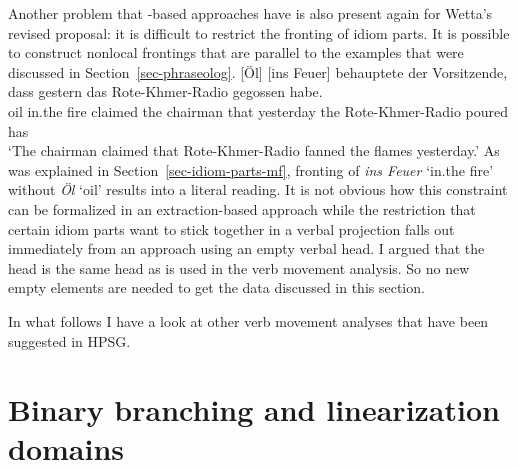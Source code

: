 \begin{exe}
\begin{xlist}
Another problem that \slasch-based approaches have is also present again for Wetta's revised
proposal: it is difficult to restrict the fronting of idiom parts. It is possible to construct
nonlocal frontings that are parallel to the examples that were discussed in Section~\ref{sec-phraseolog}.
\ea 
\gll {}[Öl] [ins Feuer] behauptete der Vorsitzende, dass gestern das Rote-Khmer-Radio gegossen habe.\\
	 \spacebr{}oil \spacebr{}in.the fire claimed the chairman that yesterday the
         Rote-Khmer-Radio poured has \\
\glt `The chairman claimed that Rote-Khmer-Radio fanned the flames yesterday.'
\z
As was explained in Section~\ref{sec-idiom-parts-mf}, fronting of \emph{ins Feuer} `in.the fire'
without \emph{Öl} `oil' results into a literal reading. It is not obvious how this constraint can be formalized in an
extraction-based approach while the restriction that certain idiom parts want to stick together in a
verbal projection falls out immediately from an approach using an empty verbal head. I argued that the head
is the same head as is used in the verb movement analysis. So no new empty elements are needed to
get the data discussed in this section.

In what follows I have a look at other verb movement analyses that have been suggested in HPSG.


\section{Binary branching and linearization domains}


\end{xlist}
\end{exe}
